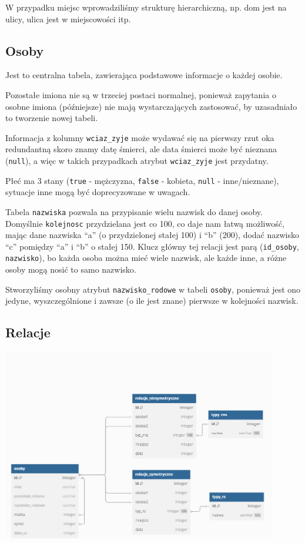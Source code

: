 \documentclass{article}
\begin{document}
W przypadku miejsc wprowadziliśmy strukturę hierarchiczną, np. dom jest na ulicy, ulica jest w miejscowości itp.

\subsection{Osoby}
Jest to centralna tabela, zawierająca podstawowe informacje o każdej osobie.

Pozostałe imiona nie są w trzeciej postaci normalnej, ponieważ zapytania o osobne imiona (późniejsze) nie mają wystarczających zastosować, by uzasadniało to tworzenie nowej tabeli.

Informacja z kolumny \texttt{wciaz\_zyje} może wydawać się na pierwszy rzut oka redundantną skoro znamy datę śmierci, ale data śmierci może być nieznana (\texttt{null}), a więc w takich przypadkach atrybut \texttt{wciaz\_zyje} jest przydatny.

Płeć ma 3 stany (\texttt{true} - mężczyzna, \texttt{false} - kobieta, \texttt{null} - inne/nieznane), sytuacje inne mogą być doprecyzowane w uwagach.

Tabela \texttt{nazwiska} pozwala na przypisanie wielu nazwisk do danej osoby. Domyślnie \texttt{kolejnosc} przydzielana jest co 100, co daje nam łatwą możliwość, mając dane nazwiska “a” (o przydzielonej stałej 100) i “b” (200), dodać nazwisko “c” pomiędzy “a” i “b” o stałej 150. Klucz główny tej relacji jest parą (\texttt{id\_osoby}, \texttt{nazwisko}), bo każda osoba można mieć wiele nazwisk, ale każde inne, a różne osoby mogą nosić to samo nazwisko.

Stworzyliśmy osobny atrybut \texttt{nazwisko\_rodowe} w tabeli \texttt{osoby}, ponieważ jest ono jedyne, wyszczególnione i zawsze (o ile jest znane) pierwsze w kolejności nazwisk.

\subsection{Relacje}

\begin{center}
    \includegraphics[width=0.9\textwidth]{img/Database_plan_a}
\end{center}
\end{document}
